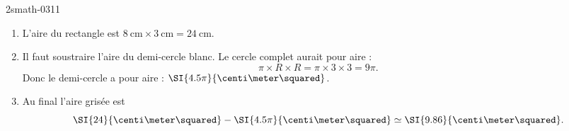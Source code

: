 
\begin{corrige}{2smath-0311}

    \begin{enumerate}
        \item
            

    L'aire du rectangle est \( \SI{8}{\centi\meter}\times \SI{3}{\centi\meter}=\SI{24}{\centi\meter}\).

\item

    Il faut soustraire l'aire du demi-cercle blanc. Le cercle complet aurait pour aire :
    \begin{equation}
        \pi\times R\times R=\pi\times 3\times 3=9\pi.
    \end{equation}
    Donc le demi-cercle a pour aire : \( \SI{4.5\pi}{\centi\meter\squared}\).

\item

    Au final l'aire grisée est
    \begin{equation}
        \SI{24}{\centi\meter\squared}-\SI{4.5\pi}{\centi\meter\squared}\simeq \SI{9.86}{\centi\meter\squared}.
    \end{equation}

    \end{enumerate}

\end{corrige}
